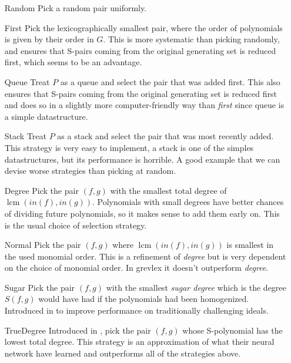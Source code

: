 \documentclass{article}
\theoremstyle{changedot}
\theoremstyle{changedotbreak}
\theoremstyle{nonumberplain}
\DeclareMathOperator{\lcm}{lcm}
\begin{document}
\begin{itemize}
  \item[Random] Pick a random pair uniformly.

  \item[First] Pick the lexicographically smallest pair, where the order of polynomials is given by their order in $G$. This is more systematic than picking randomly, and ensures that S-pairs coming from the original generating set is reduced first, which seems to be an advantage.

  \item[Queue] Treat $P$ as a queue and select the pair that was added first. This also ensures that S-pairs coming from the original generating set is reduced first and does so in a slightly more computer-friendly way than \emph{first} since queue is a simple datastructure.

  \item[Stack] Treat $P$ as a stack and select the pair that was most recently added. This strategy is very easy to implement, a stack is one of the simples datastructures, but its performance is horrible. A good example that we can devise worse strategies than picking at random.

  \item[Degree] Pick the pair $(f, g)$ with the smallest total degree of $\lcm(in(f), in(g))$. Polynomials with small degrees have better chances of dividing future polynomials, so it makes sense to add them early on. This is the usual choice of selection strategy.

  \item[Normal] Pick the pair $(f, g)$ where $\lcm(in(f), in(g))$ is smallest in the used monomial order. This is a refinement of \emph{degree} but is very dependent on the choice of monomial order. In grevlex it doesn't outperform \emph{degree}.

  \item[Sugar] Pick the pair $(f, g)$ with the smallest \emph{sugar degree} which is the degree $S(f, g)$ would have had if the polynomials had been homogenized. Introduced in \cite{sugar} to improve performance on traditionally challenging ideals. 

  \item[TrueDegree] Introduced in \cite{peifer}, pick the pair $(f, g)$ whose S-polynomial has the lowest total degree. This strategy is an approximation of what their neural network have learned and outperforms all of the strategies above.
\end{itemize}
\end{document}
